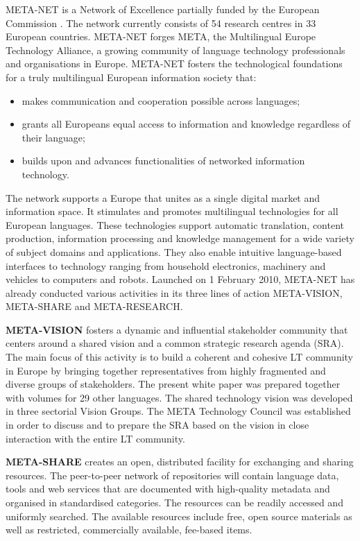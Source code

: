 \begin{multicols}{2}

META-NET is a Network of Excellence partially funded by the European Commission \cite{rehm2011}. The network currently consists of 54 research centres in 33 European countries. META-NET forges META, the Multilingual Europe Technology Alliance, a growing community of language technology professionals and organisations in Europe. META-NET fosters the technological foundations for a truly multilingual European information society that:

\begin{itemize}
\item makes communication and cooperation possible across languages;
\item grants all Europeans equal access to information and knowledge regardless of their language;
\item builds upon and advances functionalities of networked information technology.
\end{itemize}

The network supports a Europe that unites as a single digital market and information space. It stimulates and promotes multilingual technologies for all European languages. These technologies support automatic translation, content production, information processing and knowledge management for a wide variety of subject domains and applications. They also enable intuitive language-based interfaces to technology ranging from household electronics, machinery and vehicles to computers and robots.
Launched on 1 February 2010, META-NET has already conducted various activities in its three lines of action META-VISION, META-SHARE and META-RESEARCH.

\textbf{META-VISION} fosters a dynamic and influential stakeholder community that centers around a shared vision and a common strategic research agenda (SRA). The main focus of this activity is to build a coherent and cohesive LT community in Europe by bringing together representatives from highly fragmented and diverse groups of stakeholders. The present white paper was prepared together with volumes for 29 other languages. The shared technology vision was developed in three sectorial Vision Groups. The META Technology Council was established in order to discuss and to prepare the SRA based on the vision in close interaction with the entire LT community.

\textbf{META-SHARE} creates an open, distributed facility for exchanging and sharing resources. The peer-to-peer network of repositories will contain language data, tools and web services that are documented with high-quality metadata and organised in standardised categories. The resources can be readily accessed and uniformly searched. The available resources include free, open source materials as well as restricted, commercially available, fee-based items.


\end{multicols}
